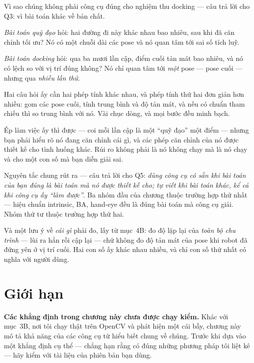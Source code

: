 \documentclass[../../marker.tex]{subfiles}
\begin{document}
Vì sao chúng không phải công cụ đúng cho nghiệm thu docking --- câu trả lời cho Q3: vì bài toán khác về bản chất.

\emph{Bài toán quỹ đạo} hỏi: hai đường đi này khác nhau bao nhiêu, sau khi đã căn chỉnh tối ưu? Nó có một chuỗi dài các pose và nó quan tâm tới sai số tích luỹ.

\emph{Bài toán docking} hỏi: qua ba mươi lần cập, điểm cuối tản mát bao nhiêu, và nó có lệch so với vị trí đúng không? Nó chỉ quan tâm tới \emph{một} pose --- pose cuối --- nhưng qua \emph{nhiều lần thử}.

Hai câu hỏi ấy cần hai phép tính khác nhau, và phép tính thứ hai đơn giản hơn nhiều: gom các pose cuối, tính trung bình và độ tản mát, và nếu có chuẩn tham chiếu thì so trung bình với nó. Vài chục dòng, và mọi bước đều minh bạch.

Ép  làm việc ấy thì được --- coi mỗi lần cập là một ``quỹ đạo'' một điểm --- nhưng bạn phải hiểu rõ nó đang căn chỉnh cái gì, và các phép căn chỉnh của nó được thiết kế cho tình huống khác. Rủi ro không phải là nó không chạy mà là nó chạy và cho một con số mà bạn diễn giải sai.

Nguyên tắc chung rút ra --- câu trả lời cho Q5: \emph{dùng công cụ có sẵn khi bài toán của bạn đúng là bài toán mà nó được thiết kế cho; tự viết khi bài toán khác, kể cả khi công cụ ấy ``làm được''}. Ba nhóm đầu của chương thuộc trường hợp thứ nhất --- hiệu chuẩn intrinsic, BA, hand-eye đều là đúng bài toán mà công cụ giải. Nhóm thứ tư thuộc trường hợp thứ hai.

Và một lưu ý về \emph{cái gì} phải đo, lấy từ  mục~4B: đo độ lặp lại của \emph{toàn bộ chu trình} --- lùi ra hẳn rồi cập lại --- chứ không đo độ tản mát của pose khi robot đã đứng yên ở vị trí cuối. Hai con số ấy khác nhau nhiều, và chỉ con số thứ nhất có nghĩa với người dùng.

\section{Giới hạn}

\textbf{Các khẳng định trong chương này chưa được chạy kiểm.} Khác với  mục~3B, nơi tôi chạy thật trên OpenCV và phát hiện một cái bẫy, chương này mô tả khả năng của các công cụ từ hiểu biết chung về chúng. Trước khi dựa vào một khẳng định cụ thể --- chẳng hạn rằng  có đúng những phương pháp tôi liệt kê --- hãy kiểm với tài liệu của phiên bản bạn dùng.
\end{document}
